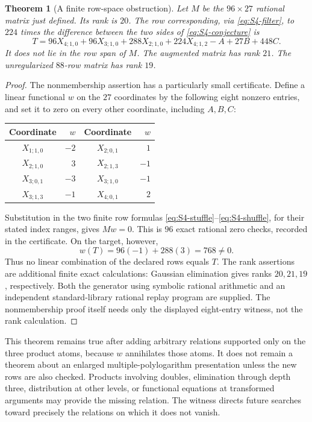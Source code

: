 \documentclass[11pt]{article}
\numberwithin{equation}{section}
\newtheorem{theorem}{Theorem}[section]
\theoremstyle{definition}
\theoremstyle{remark}
\begin{document}
\begin{theorem}[A finite row-space obstruction]\label{thm:S4-obstruction}
Let $M$ be the $96\times27$ rational matrix just defined. Its rank is
$20$. The row corresponding, via \eqref{eq:S4-filter}, to
$224$ times the difference between the two sides of
\eqref{eq:S4-conjecture} is
\begin{equation}\label{eq:S4-target}
 T=96X_{4;1,0}+96X_{3;1,0}+288X_{2;1,0}
 +224X_{4;1,2}-A+27B+448C.
\end{equation}
It does not lie in the row span of $M$. The augmented matrix has rank
$21$. The unregularized $88$-row matrix has rank $19$.
\end{theorem}
\begin{proof}
The nonmembership assertion has a particularly small certificate.
Define a linear functional $w$ on the $27$ coordinates by the following
eight nonzero entries, and set it to zero on every other coordinate,
including $A,B,C$:
\begin{center}
\begin{tabular}{cr@{\qquad}cr}
\toprule
Coordinate & $w$ & Coordinate & $w$\\\midrule
$X_{1;1,0}$&$-2$&$X_{2;0,1}$&$1$\\
$X_{2;1,0}$&$3$&$X_{2;1,3}$&$-1$\\
$X_{3;0,1}$&$-3$&$X_{3;1,0}$&$-1$\\
$X_{3;1,3}$&$-1$&$X_{4;0,1}$&$2$\\
\bottomrule
\end{tabular}
\end{center}
Substitution in the two finite row formulas
\eqref{eq:S4-stuffle}--\eqref{eq:S4-shuffle}, for their stated index
ranges, gives $Mw=0$. This is $96$ exact rational zero checks, recorded
in the certificate. On the target, however,
\[
 w(T)=96(-1)+288(3)=768\ne0.
\]
Thus no linear combination of the declared rows equals $T$.
The rank assertions are additional finite exact calculations: Gaussian
elimination gives ranks $20,21,19$, respectively. Both the generator
using symbolic rational arithmetic and an independent standard-library
rational replay program are supplied. The nonmembership proof itself
needs only the displayed eight-entry witness, not the rank calculation.
\end{proof}

This theorem remains true after adding arbitrary relations supported
only on the three product atoms, because $w$ annihilates those atoms.
It does not remain a theorem about an enlarged multiple-polylogarithm
presentation unless the new rows are also checked. Products involving
doubles, elimination through depth three, distribution at other levels,
or functional equations at transformed arguments may provide the missing
relation. The witness directs future searches toward precisely the
relations on which it does not vanish.
\end{document}
